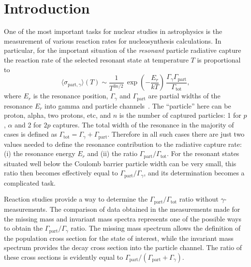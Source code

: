 \documentclass[superscriptaddress,showpacs,showkeys,twoside,floatfix,twocolumn]
{revtex4-1}
\begin{document}

  \maketitle


\section{Introduction}



One of the most important tasks for nuclear studies in astrophysics
is the measurement of various reaction rates for nucleosynthesis calculations.
In particular, for the important situation of the \emph{resonant}
particle radiative capture the reaction rate of the selected resonant state at
temperature $T$ is proportional to
%
\begin{equation}
  \langle \sigma_{\mathrm{part},\gamma} \rangle (T) \sim \frac{1}{T^{3n/2}}\,
  \exp \left(-\frac{E_r}{kT} \right)\,
  \frac{\Gamma_{\gamma} \Gamma_{\mathrm{part}}} {\Gamma_{\mathrm{tot}}},
\label{eq:rate}
\end{equation}
%
where $E_r$ is the resonance position, $\Gamma_{\gamma}$ and
$\Gamma_{\mathrm{part}}$ are partial widths of the resonance $E_r$
into gamma and particle channels~\cite{Fowler:1967}.
The ``particle'' here can be proton, alpha, two protons, etc, and $n$ is
the number of captured particles: 1 for $p$, $\alpha$ and 2 for $2p$ captures.
The total width of the resonance in the majority of cases is defined as
$\Gamma_{\mathrm{tot}} = \Gamma_{\gamma} + \Gamma_{\mathrm{part}}$.
Therefore in all such cases there are just two values needed to define
the resonance contribution to the radiative capture rate:
(i) the resonance energy $E_r$ and
(ii) the ratio $\Gamma_{\mathrm{part}} / \Gamma_{\mathrm{tot}}$.
For the resonant states situated well below the Coulomb barrier
particle width can be very small, this ratio then becomes effectively equal to
$\Gamma_{\mathrm{part}} / \Gamma_{\gamma}$,
 and its determination becomes a complicated task.


Reaction studies provide a way to determine the
$\Gamma_{\mathrm{part}} / \Gamma_{\mathrm{tot}}$
ratio without $\gamma$-measurements.
The comparison of data obtained in the measurements made for the missing mass
and invariant mass spectra represents one of the possible ways to obtain the
$\Gamma_\mathrm{part}/\Gamma_\gamma$ ratio.
The missing mass spectrum allows the definition of the population cross section
for the state of interest, while the invariant mass spectrum provides
the decay cross section into the particle channel.
The ratio of these cross sections is evidently equal to
 $\Gamma_{\mathrm{part}}/(\Gamma_{\mathrm{part}}+\Gamma_{\gamma})$.
\end{document}
